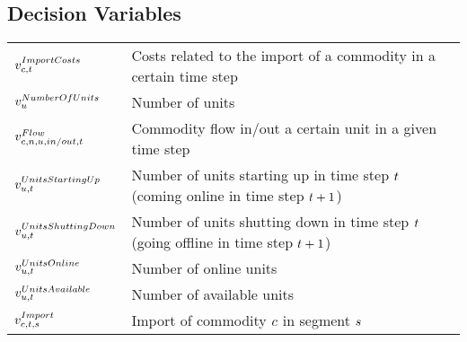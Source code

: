 \subsection*{Decision Variables}
\vspace{-1em}
	\begin{longtable}{p{\cola} p{\colc} >{\small\raggedleft\arraybackslash\itshape}p{\colb}}
		$v^{ImportCosts}_{c,t}  $	& Costs related to the import of a commodity in a certain time step	&                \\[0.5em]

		$v^{NumberOfUnits}_{u}$	& Number of units                                             	&                \\[0.5em]

		$v^{Flow}_{c,n, u,in/out,t}         $	& Commodity flow in/out a certain unit in a given time step   	&                \\
		$v^{UnitsStartingUp}_{u,t}$	& Number of units starting up in time step $t$ (coming online in time step $t +1$)	&                \\
		$v^{UnitsShuttingDown}_{u,t}$	& Number of units shutting down in time step $t$ (going offline in time step $t +1$)	&                \\
		$v^{UnitsOnline}_{u,t}  $	& Number of online units                                      	&                \\
		$v^{UnitsAvailable}_{u,t}$	& Number of available units                                   	&                \\
		$v^{Import}_{c,t,s}       $	& Import of commodity $c$ in segment $s$      	&                \\
	\end{longtable}

